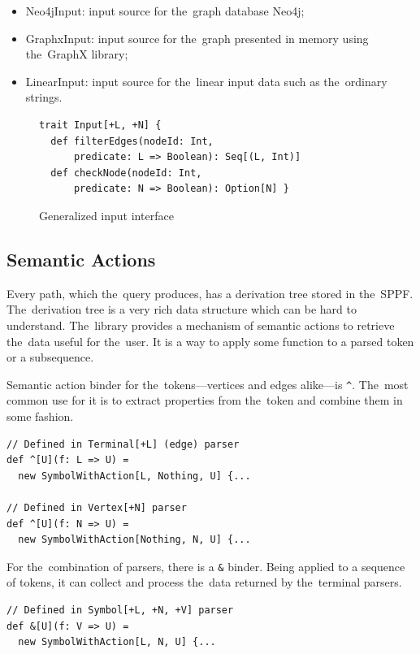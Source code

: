 \begin{itemize}
    \item Neo4jInput: input source for the~graph database Neo4j;
    \item GraphxInput: input source for the~graph presented in memory using the~GraphX library;
    \item LinearInput: input source for the~linear input data such as the~ordinary strings.
\end{itemize}

\begin{figure}[t]
\begin{lstlisting}
trait Input[+L, +N] {
  def filterEdges(nodeId: Int,
      predicate: L => Boolean): Seq[(L, Int)]
  def checkNode(nodeId: Int,
      predicate: N => Boolean): Option[N] }
\end{lstlisting}
\caption{Generalized input interface}
\label{fig:input}
\end{figure}

\subsection{Semantic Actions}
\label{sec:semanticActions}

Every path, which the~query produces, has a derivation tree stored in the~SPPF.
The~derivation tree is a very rich data structure which can be hard to understand.
The~library provides a mechanism of semantic actions to retrieve the~data useful for the~user.
It is a way to apply some function to a parsed token or a subsequence.

Semantic action binder for the~tokens---vertices and edges alike---is \lstinline{^}. The~most common use for it is to extract properties from the~token and combine them in some fashion.

\begin{lstlisting}
// Defined in Terminal[+L] (edge) parser
def ^[U](f: L => U) =
  new SymbolWithAction[L, Nothing, U] {...

// Defined in Vertex[+N] parser
def ^[U](f: N => U) =
  new SymbolWithAction[Nothing, N, U] {...
\end{lstlisting}

For the~combination of parsers, there is a \lstinline{&} binder. Being  applied to a sequence of tokens, it can collect and process the~data returned by the~terminal parsers.

\begin{lstlisting}
// Defined in Symbol[+L, +N, +V] parser
def &[U](f: V => U) =
  new SymbolWithAction[L, N, U] {...
\end{lstlisting}

